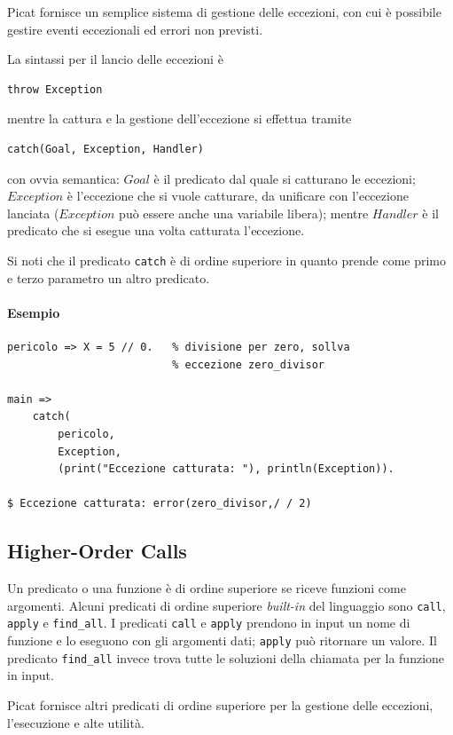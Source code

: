 \documentclass[12pt,a4paper,openright]{book}  %
\begin{document}
Picat fornisce un semplice sistema di gestione delle eccezioni, con
cui è possibile gestire eventi eccezionali ed errori non previsti.

La sintassi per il lancio delle eccezioni è
\begin{lstlisting}
throw Exception
\end{lstlisting}
mentre la cattura e la gestione dell'eccezione si effettua tramite
\begin{lstlisting}
catch(Goal, Exception, Handler)
\end{lstlisting}
con ovvia semantica: $Goal$ è il predicato dal quale si catturano le
eccezioni; $Exception$ è l'eccezione che si vuole catturare, da
unificare con l'eccezione lanciata ($Exception$ può essere anche una
variabile libera); mentre $Handler$ è il predicato che si esegue una
volta catturata l'eccezione.

Si noti che il predicato \texttt{catch} è di ordine superiore in
quanto prende come primo e terzo parametro un altro predicato.

\paragraph{Esempio}

\begin{verbatim}
pericolo => X = 5 // 0.   % divisione per zero, sollva
                          % eccezione zero_divisor

main =>
    catch(
        pericolo, 
        Exception, 
        (print("Eccezione catturata: "), println(Exception)).

$ Eccezione catturata: error(zero_divisor,/ / 2)
\end{verbatim}

\subsection{Higher-Order Calls}
\label{subsec:picat_advanced_hoc}

Un predicato o una funzione è di ordine superiore se riceve funzioni
come argomenti. Alcuni predicati di ordine superiore \emph{built-in}
del linguaggio sono \verb|call|, \verb|apply| e \verb|find_all|. I
predicati \verb|call| e \verb|apply| prendono in input un nome di
funzione e lo eseguono con gli argomenti dati; \verb|apply| può
ritornare un valore. Il predicato \verb|find_all| invece trova tutte
le soluzioni della chiamata per la funzione in input.

Picat fornisce altri predicati di ordine superiore per la gestione
delle eccezioni, l'esecuzione e alte utilità.
\end{document}

